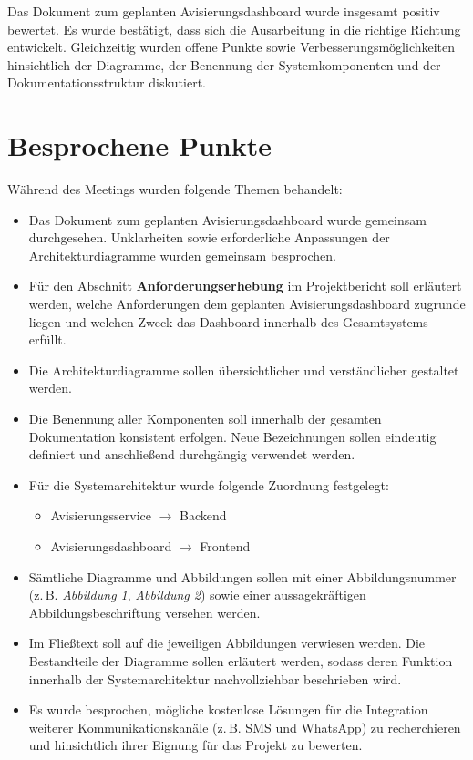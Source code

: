 \documentclass[a4paper,11pt]{article}
\begin{document}
Das Dokument zum geplanten Avisierungsdashboard wurde insgesamt positiv bewertet. Es wurde bestätigt, dass sich die Ausarbeitung in die richtige Richtung entwickelt. Gleichzeitig wurden offene Punkte sowie Verbesserungsmöglichkeiten hinsichtlich der Diagramme, der Benennung der Systemkomponenten und der Dokumentationsstruktur diskutiert.

\vspace{0.5cm}

\section{Besprochene Punkte}

Während des Meetings wurden folgende Themen behandelt:

\begin{itemize}[leftmargin=1.2cm]

\item Das Dokument zum geplanten Avisierungsdashboard wurde gemeinsam durchgesehen. Unklarheiten sowie erforderliche Anpassungen der Architekturdiagramme wurden gemeinsam besprochen.

\item Für den Abschnitt \textbf{Anforderungserhebung} im Projektbericht soll erläutert werden, welche Anforderungen dem geplanten Avisierungsdashboard zugrunde liegen und welchen Zweck das Dashboard innerhalb des Gesamtsystems erfüllt.

\item Die Architekturdiagramme sollen übersichtlicher und verständlicher gestaltet werden.

\item Die Benennung aller Komponenten soll innerhalb der gesamten Dokumentation konsistent erfolgen. Neue Bezeichnungen sollen eindeutig definiert und anschließend durchgängig verwendet werden.

\item Für die Systemarchitektur wurde folgende Zuordnung festgelegt:

\begin{itemize}
    \item Avisierungsservice $\rightarrow$ Backend
    \item Avisierungsdashboard $\rightarrow$ Frontend
\end{itemize}

\item Sämtliche Diagramme und Abbildungen sollen mit einer Abbildungsnummer (z.\,B. \textit{Abbildung 1}, \textit{Abbildung 2}) sowie einer aussagekräftigen Abbildungsbeschriftung versehen werden.

\item Im Fließtext soll auf die jeweiligen Abbildungen verwiesen werden. Die Bestandteile der Diagramme sollen erläutert werden, sodass deren Funktion innerhalb der Systemarchitektur nachvollziehbar beschrieben wird.

\item Es wurde besprochen, mögliche kostenlose Lösungen für die Integration weiterer Kommunikationskanäle (z.\,B. SMS und WhatsApp) zu recherchieren und hinsichtlich ihrer Eignung für das Projekt zu bewerten.

\end{itemize}
\end{document}
